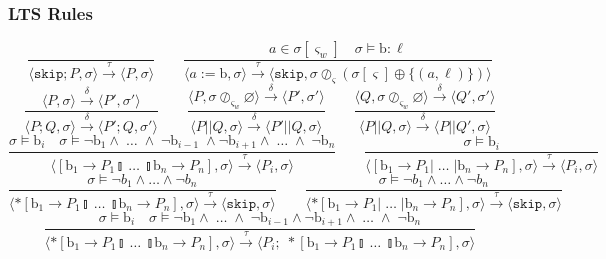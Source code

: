 \documentclass[times,10pt]{article}
\begin{document}
\subsubsection{LTS Rules}
$$
    \frac{}{\langle \mathtt{skip}; P, \sigma \rangle \xrightarrow{\tau} \langle P, \sigma \rangle} \qquad
    \frac{a \in \sigma[\varsigma_w] \quad \sigma \models \mathrm{b} : \ell}{\langle a := \mathrm{b}, \sigma \rangle \xrightarrow{\tau} \langle \mathtt{skip}, \sigma \oslash_\varsigma (\sigma[\varsigma] \oplus \{(a, \ell)\}) \rangle} $$$$
    \frac{\langle P, \sigma \rangle \xrightarrow{\delta} \langle P', \sigma' \rangle}{\langle P ; Q, \sigma \rangle \xrightarrow{\delta} \langle P' ; Q, \sigma' \rangle} \qquad
    \frac{\langle P, \sigma \oslash_{\varsigma_w} \varnothing \rangle \xrightarrow{\delta} \langle P', \sigma' \rangle}{\langle P || Q, \sigma \rangle \xrightarrow{\delta} \langle P' || Q, \sigma \rangle} \qquad
    \frac{\langle Q, \sigma \oslash_{\varsigma_w} \varnothing \rangle \xrightarrow{\delta} \langle Q', \sigma' \rangle}{\langle P || Q, \sigma \rangle \xrightarrow{\delta} \langle P || Q', \sigma \rangle} $$$$
    \frac{\sigma \models \textrm{b}_i \quad \sigma \models \lnot \mathrm{b}_1 \wedge \; \ldots \; \wedge \; \lnot \mathrm{b}_{i-1} \; \wedge \lnot \mathrm{b}_{i+1} \wedge \; \ldots \; \wedge \; \lnot\mathrm{b}_n } {\langle [ \mathrm{b}_1 \rightarrow P_1  \talloblong \; \ldots \; \talloblong \mathrm{b}_n \rightarrow P_n ] , \sigma \rangle \xrightarrow{\tau} \langle P_i , \sigma\rangle  } \qquad
    \frac{\sigma \models \textrm{b}_i} {\langle [ \mathrm{b}_1 \rightarrow P_1  | \; \ldots \; | \mathrm{b}_n \rightarrow P_n ] , \sigma \rangle \xrightarrow{\tau} \langle P_i , \sigma\rangle  } $$$$
    \frac{\sigma \models \lnot b_1 \wedge \ldots \wedge \lnot b_n}{\langle *[ \mathrm{b}_1 \rightarrow P_1  \talloblong \; \ldots \; \talloblong \mathrm{b}_n \rightarrow P_n ] , \sigma \rangle \xrightarrow{\tau} \langle \mathtt{skip} , \sigma\rangle } \qquad
    \frac{\sigma \models \lnot b_1 \wedge \ldots \wedge \lnot b_n}{\langle *[ \mathrm{b}_1 \rightarrow P_1  | \; \ldots \; | \mathrm{b}_n \rightarrow P_n ] , \sigma \rangle \xrightarrow{\tau} \langle \mathtt{skip} , \sigma \rangle } $$$$
    \frac{\sigma \models \textrm{b}_i \quad \sigma \models \lnot \mathrm{b}_1 \wedge \; \ldots \; \wedge \; \lnot \mathrm{b}_{i-1} \wedge \lnot \mathrm{b}_{i+1} \wedge \; \ldots \; \wedge \; \lnot\mathrm{b}_n } {\langle *[ \mathrm{b}_1 \rightarrow P_1  \talloblong \; \ldots \; \talloblong \mathrm{b}_n \rightarrow P_n ] , \sigma \rangle \xrightarrow{\tau} \langle P_i; \; *[ \mathrm{b}_1 \rightarrow P_1  \talloblong \; \ldots \; \talloblong \mathrm{b}_n \rightarrow P_n ] , \sigma\rangle  } $$$$
$$
\end{document}
